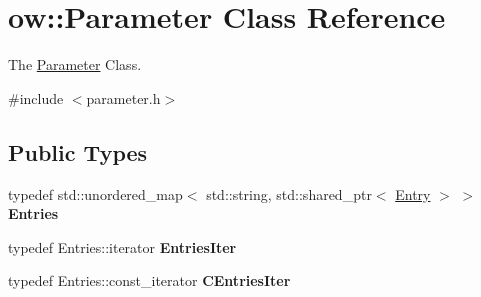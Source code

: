 \hypertarget{classow_1_1Parameter}{}\section{ow\+:\+:Parameter Class Reference}
\label{classow_1_1Parameter}


The \hyperlink{classow_1_1Parameter}{Parameter} Class.  




{\ttfamily \#include $<$parameter.\+h$>$}

\subsection*{Public Types}
\begin{DoxyCompactItemize}
\item 
typedef std\+::unordered\+\_\+map$<$ std\+::string, std\+::shared\+\_\+ptr$<$ \hyperlink{classow_1_1Entry}{Entry} $>$ $>$ {\bfseries Entries}\hypertarget{classow_1_1Parameter_a1f5f584e9898172723d310f900a803ae}{}\label{classow_1_1Parameter_a1f5f584e9898172723d310f900a803ae}

\item 
typedef Entries\+::iterator {\bfseries Entries\+Iter}\hypertarget{classow_1_1Parameter_a08a9d8533b720469ff3e64872e35f52b}{}\label{classow_1_1Parameter_a08a9d8533b720469ff3e64872e35f52b}

\item 
typedef Entries\+::const\+\_\+iterator {\bfseries C\+Entries\+Iter}\hypertarget{classow_1_1Parameter_acf7ddd1242584a89fe69b8d417bd65a0}{}\label{classow_1_1Parameter_acf7ddd1242584a89fe69b8d417bd65a0}

\end{DoxyCompactItemize}
